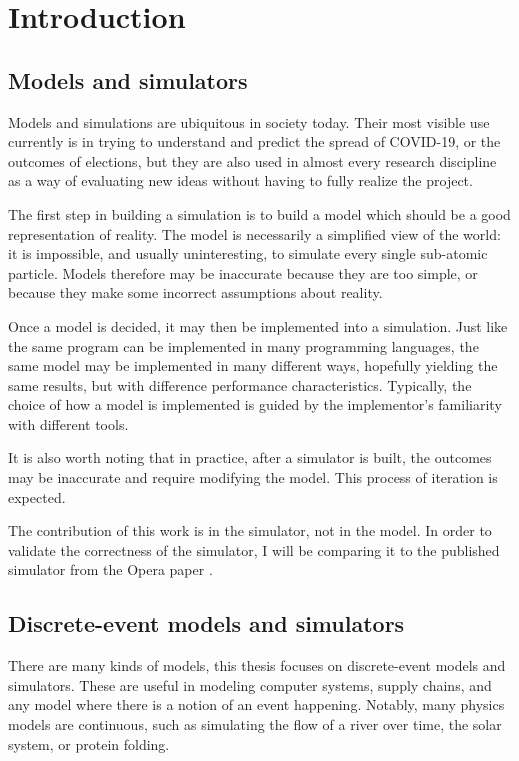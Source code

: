 \chapter{Introduction} \label{intro}


\section{Models and simulators} \label{models-and-sims}

Models and simulations are ubiquitous in society today.
Their most visible use currently is in trying to understand and predict the spread of COVID-19, or the outcomes of elections, but they are also used in almost every research discipline as a way of evaluating new ideas without having to fully realize the project.

The first step in building a simulation is to build a model which should be a good representation of reality.
The model is necessarily a simplified view of the world: it is impossible, and usually uninteresting, to simulate every single sub-atomic particle.
Models therefore may be inaccurate because they are too simple, or because they make some incorrect assumptions about reality.

Once a model is decided, it may then be implemented into a simulation.
Just like the same program can be implemented in many programming languages, the same model may be implemented in many different ways, hopefully yielding the same results, but with difference performance characteristics.
Typically, the choice of how a model is implemented is guided by the implementor's familiarity with different tools.

It is also worth noting that in practice, after a simulator is built, the outcomes may be inaccurate and require modifying the model.
This process of iteration is expected.

The contribution of this work is in the simulator, not in the model.
In order to validate the correctness of the simulator, I will be comparing it to the published simulator from the Opera paper \opera. 

\section{Discrete-event models and simulators} \label{discrete-event-sims}

There are many kinds of models,  this thesis focuses on discrete-event models and simulators.
These are useful in modeling computer systems, supply chains, and any model where there is a notion of an event happening.
Notably, many physics models are continuous, such as simulating the flow of a river over time, the solar system, or protein folding.


